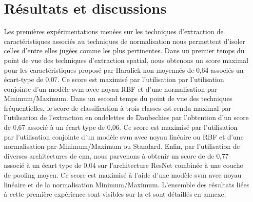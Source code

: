 \clearpage

\section{Résultats et discussions}
Les premières expérimentations menées sur les techniques d'extraction de caractéristiques associés au techniques de normalisation nous permettent d'isoler celles d'entre elles jugées comme les plus pertinentes. Dans un premier temps du point de vue des techniques d'extraction spatial, nous obtenons un score maximal pour les caractéristiques proposé par Haralick non moyennés de 0,64 associés un écart-type de 0,07. Ce score est maximisé par l'utilisation par l'utilisation conjointe d'un modèle \gls{svm} avec noyau RBF et d'une normalisation par Minimum/Maximum. Dans un second temps du point de vue des techniques fréquentielles, le score de classification à trois classes est rendu maximal par l'utilisation de l'extraction en ondelettes de Daubechies par l'obtention d'un score de 0,67 associé à un écart type de 0,06. Ce score est maximisé par l'utilisation par l'utilisation conjointe d'un modèle \gls{svm} avec noyau linéaire ou RBF et d'une normalisation par Minimum/Maximum ou Standard. Enfin, par l'utilisation de diverses architectures de \gls{cnn}, nous parvenons à obtenir un score de de 0,77 associé à un écart type de 0,04 sur l'architecture ResNet combinée à une couche de pooling moyen. Ce score est maximisé à l'aide d'une modèle \gls{svm} avec noyau linéaire et de la normalisation Minimum/Maximum. L'ensemble des résultats liées à cette première expérience sont visibles sur la  et sont détaillés en annexe.\par

